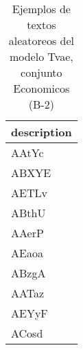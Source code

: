 \begin{table}[H]
\centering
\fontsize{8}{14}\selectfont
\caption{Ejemplos de textos aleatoreos del modelo Tvae, conjunto Economicos (B-2)}
\label{table-sample10-economicos-b-2-tvae-text}
\begin{tabular}{|m{50em}|}
\hline
\rowcolor[gray]{0.8}
description \\
\hline AAtYc \\
\hline ABXYE \\
\hline AETLv \\
\hline ABthU \\
\hline AAerP \\
\hline AEaoa \\
\hline ABzgA \\
\hline AATaz \\
\hline AEYyF \\
\hline ACosd \\
\hline
\end{tabular}
\end{table}
